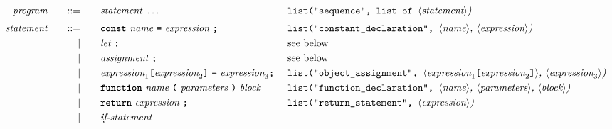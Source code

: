\begin{alignat*}{9}
&& \textit{program}    &&\quad ::= &\quad && \textit{statement} \ \ldots
                                                           && \texttt{list("sequence", list of  } \langle \textit{statement}\rangle \textit{)} \\[1mm]
&& \textit{statement}    &&\quad ::= &\quad && \textbf{\texttt{const}}\  \textit{name} \ 
                                           \textbf{\texttt{=}}\  \textit{expression} \ \textbf{\texttt{;}}
                                                           && \texttt{list("constant\_declaration",  } \langle \textit{name}\rangle \textit{,  } \langle \textit{expression}\rangle \textit{)} \\
&&                       && |   &\quad && \textit{let} \ \textbf{\texttt{;}}
                                                           &&  \textrm{see below}\\
&&                       && |   &\quad && \textit{assignment} \ \textbf{\texttt{;}}
                                                           && \textrm{see below}\\
&&                       && |   &\quad && \textit{expression}_1 \textbf{\texttt{[}}
                                          \textit{expression}_2 \textbf{\texttt{]}} \ 
                                           \textbf{\texttt{=}}\  \textit{expression}_3  \textbf{\texttt{;}}\ 
                                                           && \texttt{list("object\_assignment", } \langle \textit{expression}_1 \textbf{\texttt{[}} \textit{expression}_2 \textbf{\texttt{]}}  \rangle \textit{,  } \langle \textit{expression}_3\rangle \textit{)} \\
&&                       && |   &\quad && \textbf{\texttt{function}}\  \textit{name} \ 
                                   \textbf{\texttt{(}}\  \textit{parameters} \ \textbf{\texttt{)}}\ \textit{block} \quad
                                                           &&  \texttt{list("function\_declaration",  } \langle \textit{name}\rangle \textit{, } \langle \textit{parameters}\rangle \textit{,}\ \langle \textit{block}\rangle \textit{)} \\
&&                       && |   &\quad && \textbf{\texttt{return}}\  \textit{expression} \ \textbf{\texttt{;}}
                                                           && \texttt{list("return\_statement",  } \langle \textit{expression}\rangle \textit{)} \\
&&                       && |   &\quad && \textit{if-statement} \quad

\end{alignat*}
